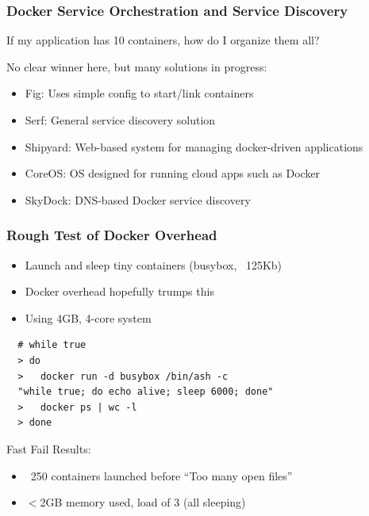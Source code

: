\documentclass[xcolor=dvipsnames]{beamer}
\begin{document}
\begin{frame}
  \frametitle{Docker Service Orchestration and Service Discovery}

  If my application has 10 containers, how do I organize them all? 
  \vspace{5mm}

  No clear winner here, but many solutions in progress: 
  \begin{itemize}
    \item Fig: Uses simple config to start/link containers
    \item Serf: General service discovery solution
    \item Shipyard: Web-based system for managing docker-driven applications
    \item CoreOS: OS designed for running cloud apps such as Docker
    \item SkyDock: DNS-based Docker service discovery
  \end{itemize}
\end{frame}

\begin{frame}[fragile]
  \frametitle{Rough Test of Docker Overhead}

  \begin{itemize}
    \item Launch and sleep tiny containers (busybox, ~125Kb)
    \item Docker overhead hopefully trumps this
    \item Using 4GB, 4-core system
  \end{itemize}

  \begin{lstlisting}
  # while true
  > do 
  >   docker run -d busybox /bin/ash -c 
  "while true; do echo alive; sleep 6000; done"
  >   docker ps | wc -l 
  > done
  \end{lstlisting}

  Fast Fail Results:  
   
  \begin{itemize}
    \item ~250 containers launched before ``Too many open files''
    \item $<$2GB memory used, load of 3 (all sleeping)
  \end{itemize}

\end{frame}
\end{document}
